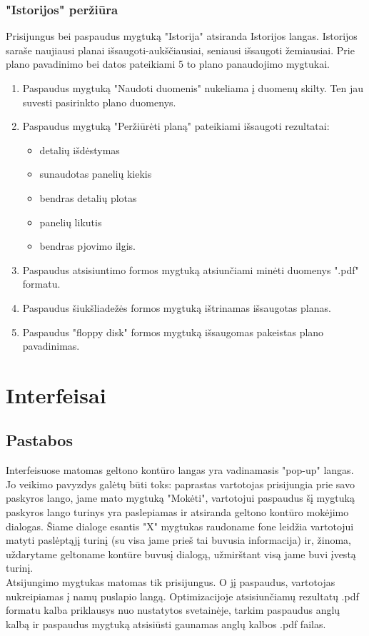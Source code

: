 \documentclass[a4paper,12pt]{article}
\begin{document}
\subsubsection{"Istorijos" peržiūra}
Prisijungus bei paspaudus mygtuką "Istorija" atsiranda Istorijos langas.
Istorijos saraše naujiausi planai išsaugoti-aukščiausiai, seniausi išsaugoti žemiausiai.
Prie plano pavadinimo bei datos pateikiami 5 to plano panaudojimo mygtukai.
\begin{enumerate}
	\item Paspaudus mygtuką "Naudoti duomenis" nukeliama į duomenų skilty.
		Ten jau suvesti pasirinkto plano duomenys.
	\item Paspaudus mygtuką "Peržiūrėti planą" pateikiami išsaugoti rezultatai:
		\begin{itemize}
			\item detalių išdėstymas
			\item sunaudotas panelių kiekis
			\item bendras detalių plotas
			\item panelių likutis
			\item bendras pjovimo ilgis.
		\end{itemize}
	\item Paspaudus atsisiuntimo formos mygtuką atsiunčiami minėti duomenys ".pdf" formatu.
	\item Paspaudus šiukšliadežės formos mygtuką ištrinamas išsaugotas planas.
	\item Paspaudus "floppy disk" formos mygtuką išsaugomas pakeistas plano pavadinimas.
\end{enumerate}
\clearpage

\section{Interfeisai}

\subsection{Pastabos}
Interfeisuose matomas geltono kontūro langas yra vadinamasis "pop-up" langas. Jo veikimo pavyzdys galėtų būti toks: paprastas vartotojas prisijungia prie savo paskyros lango, jame mato mygtuką "Mokėti", vartotojui paspaudus šį mygtuką paskyros lango turinys yra paslepiamas ir atsiranda geltono kontūro mokėjimo dialogas. Šiame dialoge esantis "X" mygtukas raudoname fone leidžia vartotojui matyti paslėptąjį turinį (su visa jame prieš tai buvusia informacija) ir, žinoma, uždarytame geltoname kontūre buvusį dialogą, užmirštant visą jame buvi įvestą turinį.\\
Atsijungimo mygtukas matomas tik prisijungus. O jį paspaudus, vartotojas nukreipiamas į namų puslapio langą.
Optimizacijoje atsisiunčiamų rezultatų .pdf formatu kalba priklausys nuo nustatytos svetainėje, tarkim paspaudus anglų kalbą ir paspaudus mygtuką atsisiūsti gaunamas anglų kalbos .pdf failas.
\end{document}
